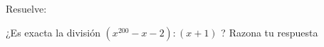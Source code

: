 \documentclass[addpoints,spanish, 12pt,a4paper]{exam}
\begin{document}
\begin{questions}
\begin{multicols}{1}
\begin{parts}
        \end{parts}
        \end{multicols}
        \question Resuelve:
        \begin{multicols}{1} 
        \end{multicols}

        \question[1] ¿Es exacta la división $\left(x^{200}-x-2\right) : \left(x+1\right)$ ? Razona tu respuesta    
    \end{questions}
    
\end{document}
